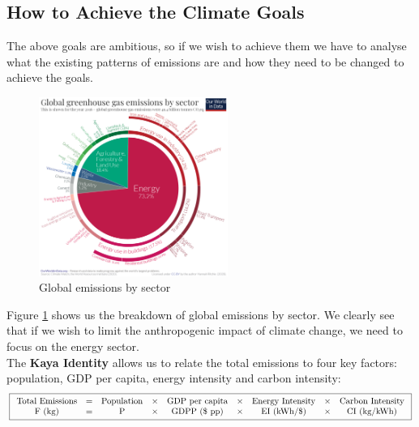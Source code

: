 \subsection{How to Achieve the Climate Goals}
\label{sec:achieve_climate_goals}

The above goals are ambitious, so if we wish to achieve them we have to analyse
what the existing patterns of emissions are and how they need to be changed to
achieve the goals.

\begin{figure}[ht]
    \centering
    \includegraphics[width=0.55\textwidth]{figures/emissions-pie-chart.png}
    \caption{Global  emissions by sector}
    \label{fig:emissions_pie_chart}
\end{figure}

Figure \ref{fig:emissions_pie_chart} shows us the breakdown of global 
emissions by sector. We clearly see that if we wish to limit the anthropogenic
impact of climate change, we need to focus on the energy sector. \\

\noindent The \textbf{Kaya Identity} allows us to relate the total emissions to four key
factors: population, GDP per capita, energy intensity and carbon intensity:
\begin{equation*}
    \boxed{
    \begin{array}{c c c c c c c c c}
    \text{Total Emissions} & = & \text{Population} & \times & \text{GDP per capita}
    & \times & \text{Energy Intensity} & \times & \text{Carbon Intensity} \\
    \text{F\ (kg)} & = & \text{P} & \times & \text{GDPP (\$ pp)} &\times & \text{EI\ (kWh/\$)}
    & \times & \text{CI\ (kg/kWh)}\\
    \end{array}}
\end{equation*}


